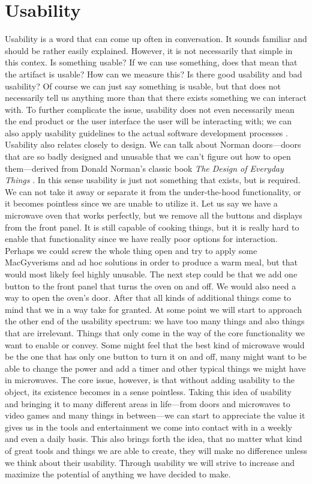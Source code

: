 \section{Usability}
Usability is a word that can come up often in conversation. It sounds familiar and should be rather easily explained. However, it is not necessarily that simple in this contex. Is something usable? If we can use something, does that mean that the artifact is usable? How can we measure this? Is there good usability and bad usability? Of course we can just say something is usable, but that does not necessarily tell us anything more than that there exists something we can interact with. To further complicate the issue, usability does not even necessarily mean the end product or the user interface the user will be interacting with; we can also apply usability guidelines to the actual software development processes \cite{Carvajal2013}. Usability also relates closely to design. We can talk about Norman doors---doors that are so badly designed and unusable that we can't figure out how to open them---derived from Donald Norman's classic book \textit{The Design of Everyday Things} \cite{Norman2013a}. In this sense usability is just not something that exists, but is required. We can not take it away or separate it from the under-the-hood functionality, or it becomes pointless since we are unable to utilize it. Let us say we have a microwave oven that works perfectly, but we remove all the buttons and displays from the front panel. It is still capable of cooking things, but it is really hard to enable that functionality since we have really poor options for interaction. Perhaps we could screw the whole thing open and try to apply some MacGyverisms and ad hoc solutions in order to produce a warm meal, but that would most likely feel highly unusable. The next step could be that we add one button to the front panel that turns the oven on and off. We would also need a way to open the oven's door. After that all kinds of additional things come to mind that we in a way take for granted. At some point we will start to approach the other end of the usability spectrum: we have too many things and also things that are irrelevant. Things that only come in the way of the core functionality we want to enable or convey. Some might feel that the best kind of microwave would be the one that has only one button to turn it on and off, many might want to be able to change the power and add a timer and other typical things we might have in microwaves. The core issue, however, is that without adding usability to the object, its existence becomes in a sense pointless. Taking this idea of usability and bringing it to many different areas in life---from doors and microwaves to video games and many things in between---we can start to appreciate the value it gives us in the tools and entertainment we come into contact with in a weekly and even a daily basis. This also brings forth the idea, that no matter what kind of great tools and things we are able to create, they will make no difference unless we think about their usability. Through usability we will strive to increase and maximize the potential of anything we have decided to make.

